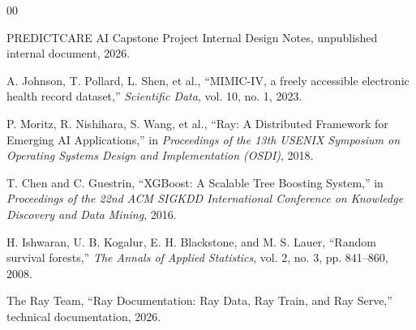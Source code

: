 \begin{thebibliography}{00}

 PREDICTCARE AI Capstone Project Internal Design Notes, unpublished internal document, 2026.

 A. Johnson, T. Pollard, L. Shen, et al., ``MIMIC-IV, a freely accessible electronic health record dataset,'' \textit{Scientific Data}, vol. 10, no. 1, 2023.

 P. Moritz, R. Nishihara, S. Wang, et al., ``Ray: A Distributed Framework for Emerging AI Applications,'' in \textit{Proceedings of the 13th USENIX Symposium on Operating Systems Design and Implementation (OSDI)}, 2018.

 T. Chen and C. Guestrin, ``XGBoost: A Scalable Tree Boosting System,'' in \textit{Proceedings of the 22nd ACM SIGKDD International Conference on Knowledge Discovery and Data Mining}, 2016.

 H. Ishwaran, U. B. Kogalur, E. H. Blackstone, and M. S. Lauer, ``Random survival forests,'' \textit{The Annals of Applied Statistics}, vol. 2, no. 3, pp. 841--860, 2008.

 The Ray Team, ``Ray Documentation: Ray Data, Ray Train, and Ray Serve,'' technical documentation, 2026.

\end{thebibliography}